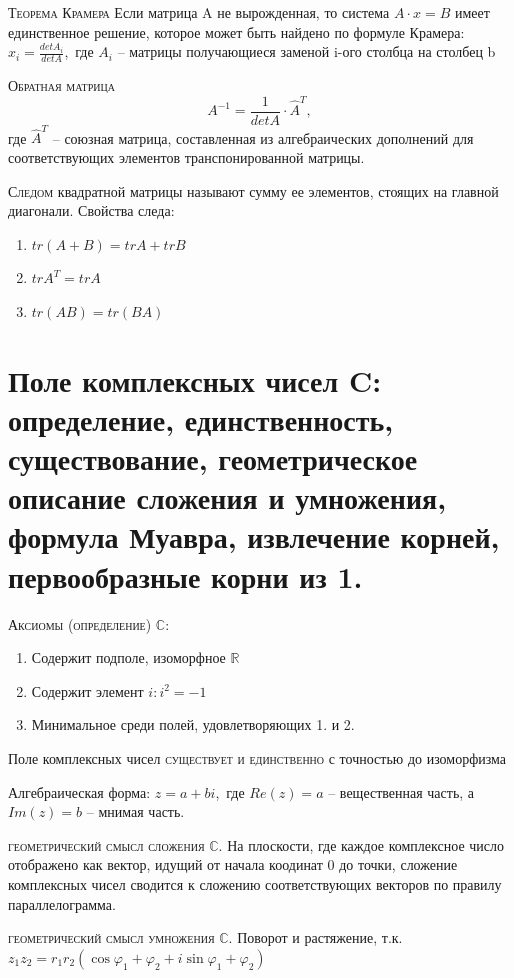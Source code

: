 \documentclass{article}
\begin{document}
\textsc{Теорема Крамера} Если матрица A не вырожденная, то система $A\cdot x=B$ имеет единственное решение,
которое может быть найдено по формуле Крамера: $x_i=\frac{det A_i}{det A}$, где $A_i$ – матрицы получающиеся заменой i-ого столбца на столбец b

\textsc{Обратная матрица}
$$A^{-1}=\frac{1}{det A}\cdot \hat{A}^T,$$
где $\hat{A}^T$ – союзная матрица, составленная из алгебраических дополнений для соответствующих элементов транспонированной матрицы.

\textsc{Следом} квадратной матрицы называют сумму ее элементов, стоящих на главной диагонали.
Свойства следа:
\begin{enumerate}
    \item $tr(A+B)=trA+trB$
    \item $trA^T=trA$
    \item $tr(AB)=tr(BA)$
\end{enumerate}

\section{Поле комплексных чисел C: определение, единственность, существование, геометрическое описание сложения и умножения, формула Муавра, извлечение корней, первообразные корни из 1.}

\textsc{Аксиомы (определение) $\mathbb{C}$:}
\begin{enumerate}
    \item Содержит подполе, изоморфное $\mathbb{R}$
    \item Содержит элемент $i: i^2=-1$
    \item Минимальное среди полей, удовлетворяющих 1. и 2.
\end{enumerate}

Поле комплексных чисел \textsc{существует и единственно} с точностью до изоморфизма

Алгебраическая форма: $z=a+bi$, где $Re(z)=a$ – вещественная часть, а $Im(z)=b$ – мнимая часть.

\textsc{геометрический смысл сложения $\mathbb{C}$.}
На плоскости, где каждое комплексное число  отображено как вектор, идущий от начала коодинат 0 до точки, сложение комплексных чисел сводится к сложению соответствующих векторов по правилу параллелограмма.

\textsc{геометрический смысл умножения $\mathbb{C}$.}
Поворот и растяжение, т.к. $z_1z_2=r_1r_2(\cos{\varphi_1+\varphi_2}+i\sin{\varphi_1+\varphi_2})$
\end{document}

